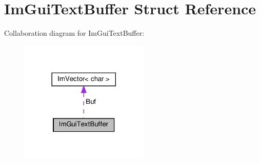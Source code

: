 \hypertarget{structImGuiTextBuffer}{}\section{Im\+Gui\+Text\+Buffer Struct Reference}
\label{structImGuiTextBuffer}


Collaboration diagram for Im\+Gui\+Text\+Buffer\+:\nopagebreak
\begin{figure}[H]
\begin{center}
\leavevmode
\includegraphics[width=173pt]{structImGuiTextBuffer__coll__graph}
\end{center}
\end{figure}
